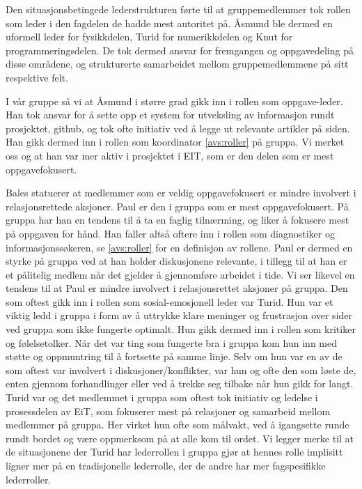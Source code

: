 Den situasjonsbetingede lederstrukturen førte til at gruppemedlemmer tok rollen som 
leder i den fagdelen de hadde mest autoritet på. Åsmund ble dermed en uformell leder 
for fysikkdelen, Turid for numerikkdelen og Knut for programmeringsdelen. De 
tok dermed ansvar for fremgangen og oppgavedeling på disse områdene, og strukturerte
samarbeidet mellom gruppemedlemmene på sitt respektive felt. 

I vår gruppe så vi at Åsmund i større grad gikk inn i rollen som oppgave-leder. Han 
tok ansvar for å sette opp et system for utveksling av informasjon rundt prosjektet, 
github, og tok ofte initiativ ved å legge ut relevante artikler på siden. Han gikk 
dermed inn i rollen som koordinator \cref{avs:roller} på gruppa. Vi merket oss og at han var 
mer aktiv i prosjektet i EIT, som er den delen som er mest oppgavefokusert. 

Bales statuerer at medlemmer som er veldig oppgavefokusert er mindre involvert i 
relasjonsrettede aksjoner. Paul er den i gruppa som er mest oppgavefokusert. 
På gruppa har han en tendens til å ta en faglig tilnærming, og liker å fokusere mest 
på oppgaven for hånd. Han faller altså oftere inn i rollen som diagnostiker og 
informasjonssøkeren, se \cref{avs:roller} for en definisjon av rollene. Paul er dermed en styrke på gruppa ved at han holder 
diskusjonene relevante, i tillegg til at han er et pålitelig medlem når det gjelder 
å gjennomføre arbeidet i tide. Vi ser likevel en tendens til at Paul er mindre involvert 
i relasjonsrettet aksjoner på gruppa. 
Den som oftest gikk inn i rollen som sosial-emosjonell leder var Turid. Hun var et viktig 
ledd i gruppa i form av å uttrykke klare meninger og frustrasjon over sider ved gruppa
som ikke fungerte optimalt. Hun gikk dermed inn i rollen som kritiker og følelsetolker.
Når det var ting som fungerte bra i gruppa kom hun inn med støtte og oppmuntring til å 
fortsette på samme linje. Selv om hun var en av de som oftest var involvert i diskusjoner/konflikter,
var hun og ofte den som løste de, enten gjennom forhandlinger eller ved å trekke seg tilbake
når hun gikk for langt. Turid var og det medlemmet i gruppa som oftest tok initiativ og ledelse 
i prosessdelen av EiT, som fokuserer mest på relasjoner og samarbeid mellom medlemmer på gruppa. 
Her virket hun ofte som målvakt, ved å igangsette runde rundt bordet og være oppmerksom på 
at alle kom til ordet. Vi legger merke til at de situasjonene der Turid har
lederrollen i gruppa gjør at hennes rolle implisitt ligner mer på en tradisjonelle lederrolle, der de
andre har mer fagspesifikke lederroller. 

